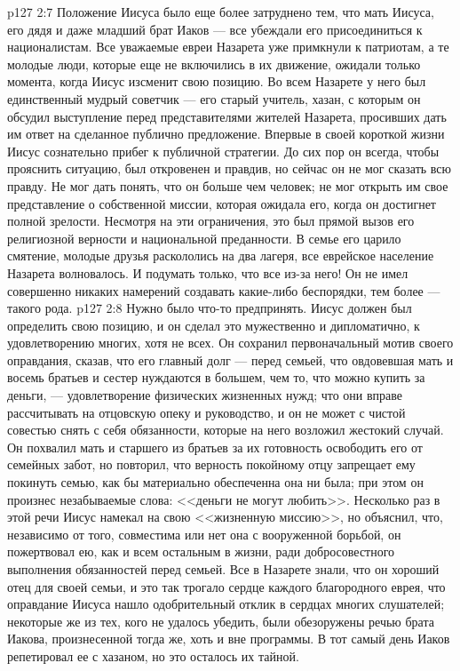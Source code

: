 \vs p127 2:7 Положение Иисуса было еще более затруднено тем, что мать Иисуса, его дядя и даже младший брат Иаков --- все убеждали его присоединиться к националистам. Все уважаемые евреи Назарета уже примкнули к патриотам, а те молодые люди, которые еще не включились в их движение, ожидали только момента, когда Иисус изсменит свою позицию. Во всем Назарете у него был единственный мудрый советчик --- его старый учитель, хазан, с которым он обсудил выступление перед представителями жителей Назарета, просивших дать им ответ на сделанное публично предложение. Впервые в своей короткой жизни Иисус сознательно прибег к публичной стратегии. До сих пор он всегда, чтобы прояснить ситуацию, был откровенен и правдив, но сейчас он не мог сказать всю правду. Не мог дать понять, что он больше чем человек; не мог открыть им свое представление о собственной миссии, которая ожидала его, когда он достигнет полной зрелости. Несмотря на эти ограничения, это был прямой вызов его религиозной верности и национальной преданности. В семье его царило смятение, молодые друзья раскололись на два лагеря, все еврейское население Назарета волновалось. И подумать только, что все из\hyp{}за него! Он не имел совершенно никаких намерений создавать какие\hyp{}либо беспорядки, тем более --- такого рода.
\vs p127 2:8 Нужно было что\hyp{}то предпринять. Иисус должен был определить свою позицию, и он сделал это мужественно и дипломатично, к удовлетворению многих, хотя не всех. Он сохранил первоначальный мотив своего оправдания, сказав, что его главный долг --- перед семьей, что овдовевшая мать и восемь братьев и сестер нуждаются в большем, чем то, что можно купить за деньги, --- удовлетворение физических жизненных нужд; что они вправе рассчитывать на отцовскую опеку и руководство, и он не может с чистой совестью снять с себя обязанности, которые на него возложил жестокий случай. Он похвалил мать и старшего из братьев за их готовность освободить его от семейных забот, но повторил, что верность покойному отцу запрещает ему покинуть семью, как бы материально обеспеченна она ни была; при этом он произнес незабываемые слова: <<деньги не могут любить>>. Несколько раз в этой речи Иисус намекал на свою <<жизненную миссию>>, но объяснил, что, независимо от того, совместима или нет она с вооруженной борьбой, он пожертвовал ею, как и всем остальным в жизни, ради добросовестного выполнения обязанностей перед семьей. Все в Назарете знали, что он хороший отец для своей семьи, и это так трогало сердце каждого благородного еврея, что оправдание Иисуса нашло одобрительный отклик в сердцах многих слушателей; некоторые же из тех, кого не удалось убедить, были обезоружены речью брата Иакова, произнесенной тогда же, хоть и вне программы. В тот самый день Иаков репетировал ее с хазаном, но это осталось их тайной.
